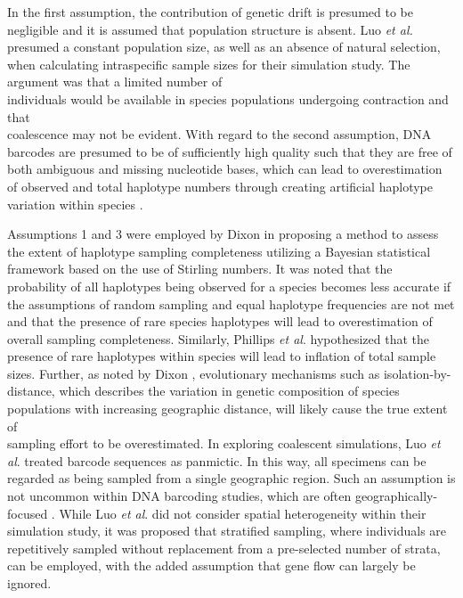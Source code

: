In the first assumption, the contribution of genetic drift is presumed to be negligible and it is assumed that population structure is absent. Luo \textit{et al.} \cite{luo2015simulation} presumed a constant population size, as well as an absence of natural selection, when calculating intraspecific sample sizes for their simulation study. The argument was that a limited number of \\ individuals would be available in species populations undergoing contraction and that \\ coalescence may not be evident. With regard to the second assumption, DNA barcodes are presumed to be of sufficiently high quality such that they are free of both ambiguous and missing nucleotide bases, which can lead to overestimation of observed and total haplotype numbers through creating artificial haplotype variation within species \cite{athey2013assessing, dasmahapatra2010mitochondrial, phillips2015exploration, stoeckle2012frequency, stoeckle2014dna}.



Assumptions 1 and 3 were employed by Dixon \cite{dixon2006means} in proposing a method to assess the extent of haplotype sampling completeness utilizing a Bayesian statistical framework based on the use of Stirling numbers. It was noted that the probability of all haplotypes being observed for a species becomes less accurate if the assumptions of random sampling and equal haplotype frequencies are not met and that the presence of rare species haplotypes will lead to overestimation of overall sampling completeness. Similarly, Phillips \textit{et al}. \cite{phillips2015exploration} hypothesized that the presence of rare haplotypes within species will lead to inflation of total sample sizes. Further, as noted by Dixon \cite{dixon2006means}, evolutionary mechanisms such as isolation-by-distance, which describes the variation in genetic composition of species populations with increasing geographic distance, will likely cause the true extent of \\ sampling effort to be overestimated. In exploring coalescent simulations, Luo \textit{et al}. \cite{luo2015simulation} treated barcode sequences as panmictic. In this way, all specimens can be regarded as being sampled from a single geographic region. Such an assumption is not uncommon within DNA barcoding studies, which are often geographically-focused \cite{collins2013seven}. While Luo \textit{et al}. \cite{luo2015simulation} did not consider spatial heterogeneity within their simulation study, it was proposed that stratified sampling, where individuals are repetitively sampled without replacement from a pre-selected number of strata, can be employed, with the added assumption that gene flow can largely be ignored.



